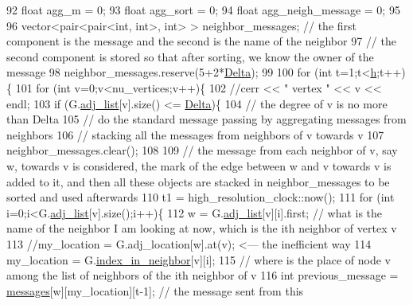 \begin{DoxyCode}
92   \textcolor{keywordtype}{float} agg\_m = 0;
93   \textcolor{keywordtype}{float} agg\_sort = 0;
94   \textcolor{keywordtype}{float} agg\_neigh\_message = 0;
95 
96   vector<pair<pair<int, int>, \textcolor{keywordtype}{int}> > neighbor\_messages; \textcolor{comment}{// the first component is the message and the
       second is the name of the neighbor}
97   \textcolor{comment}{// the second component is stored so that after sorting, we know the owner of the message}
98   neighbor\_messages.reserve(5+2*\hyperlink{classgraph__message_a45dfd061b7bc73572e5132fbf66efd55}{Delta});
99 
100   \textcolor{keywordflow}{for} (\textcolor{keywordtype}{int} t=1;t<\hyperlink{classgraph__message_a934d63ed7275c211e13c6fb68824ed46}{h};t++)\{
101     \textcolor{keywordflow}{for} (\textcolor{keywordtype}{int} v=0;v<nu\_vertices;v++)\{
102       \textcolor{comment}{//cerr << " vertex " << v << endl;}
103       \textcolor{keywordflow}{if} (G.\hyperlink{classmarked__graph_a1a0bf7ca413a278763f7c878b3b6fd6f}{adj\_list}[v].size() <= \hyperlink{classgraph__message_a45dfd061b7bc73572e5132fbf66efd55}{Delta})\{
104         \textcolor{comment}{// the degree of v is no more than Delta}
105         \textcolor{comment}{// do the standard message passing by aggregating messages from neighbors}
106         \textcolor{comment}{// stacking all the messages from neighbors of v towards v}
107         neighbor\_messages.clear();
108 
109         \textcolor{comment}{// the message from each neighbor of v, say w,  towards v is considered, the mark of the edge
       between w and v towards v is added to it, and then all these objects are stacked in neighbor\_messages to be
       sorted and used afterwards}
110         t1 = high\_resolution\_clock::now();
111         \textcolor{keywordflow}{for} (\textcolor{keywordtype}{int} i=0;i<G.\hyperlink{classmarked__graph_a1a0bf7ca413a278763f7c878b3b6fd6f}{adj\_list}[v].size();i++)\{
112           w = G.\hyperlink{classmarked__graph_a1a0bf7ca413a278763f7c878b3b6fd6f}{adj\_list}[v][i].first; \textcolor{comment}{// what is the name of the neighbor I am looking at now,
       which is the ith neighbor of vertex v }
113           \textcolor{comment}{//my\_location = G.adj\_location[w].at(v); <--- the inefficient way}
114           my\_location = G.\hyperlink{classmarked__graph_aee10b537408de42476609c1e45c075d0}{index\_in\_neighbor}[v][i];
115           \textcolor{comment}{// where is the place of node v among the list of neighbors of the ith neighbor of v}
116           \textcolor{keywordtype}{int} previous\_message = \hyperlink{classgraph__message_aac77e098f0acf9650116a8e51fe3b4b7}{messages}[w][my\_location][t-1]; \textcolor{comment}{// the message sent from this
}
\end{DoxyCode}

